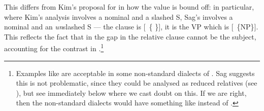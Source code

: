 \documentclass[output=paper,biblatex,babelshorthands,newtxmath,draftmode,colorlinks,citecolor=brown]{langscibook}
\begin{document}
\largerpage[-2] 
This differs from Kim's proposal for  in how the  value is
bound off: in particular, where Kim's analysis involves a nominal and a slashed S, Sag's
involves a nominal and an \emph{un}slashed S --- the clause is [~\{ \}], it
is the VP which is [~\{NP\}]. This reflects the fact that in  the gap in the
relative clause cannot be the subject, accounting for the contrast
in .\footnote{Examples like  are acceptable in some non-standard dialects of
  . Sag suggests this is not problematic, since they could be analysed as
  reduced relatives
  (see \citealt[471]{Sag:97}), but see immediately below where we cast doubt on this. If we
  are right, then the non-standard dialects would have something like 
  instead of .}
\begin{exe}\ex\begin{xlist}\label{x:rc-94}
  \label{x:rc-95}
  \label{x:rc-96}
\end{xlist}\end{exe}
\end{document}
